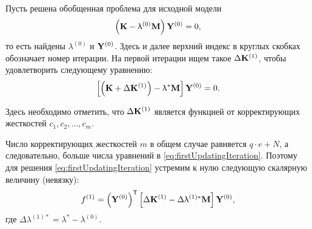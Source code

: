 Пусть решена обобщенная проблема для исходной модели
\begin{equation}
	\left( \mathbf{K} - \uplambda ^ {(0)} \mathbf{M} \right) \mathbf{Y} ^ {(0)} = 0,
	\label{eq:initEigProblem}
\end{equation}
то есть найдены $ \lambda ^ {(0)} $ и $ \mathbf{Y} ^ {(0)} $. Здесь и далее верхний индекс в круглых скобках обозначает номер итерации. На первой итерации ищем такое $ \Delta \mathbf{K} ^ {(1)} $, чтобы удовлетворить следующему уравнению:
\begin{equation}
	\left[ \left( \mathbf{K} + \Delta \mathbf{K} ^ {(1)} \right) - \uplambda ^ \ast \mathbf{M} \right] \mathbf{Y} ^ {(0)} = 0.
	\label{eq:firstUpdatingIteration}
\end{equation}

Здесь необходимо отметить, что $ \Delta \mathbf{K} ^ {(1)} $ является функцией от корректирующих жесткостей $ c_1, c_2, \hdots, c_m $. 

Число корректирующих жесткостей $ m $ в общем случае равняется $ q \cdot e + N $, а следовательно, больше числа уравнений в \eqref{eq:firstUpdatingIteration}. Поэтому для решения \eqref{eq:firstUpdatingIteration} устремим к нулю следующую скалярную величину (невязку):
\begin{equation}
	f ^ {(1)} = \left( \mathbf{Y} ^ {(0)} \right) ^ \mathsf{T} \left[ \Delta \mathbf{K} ^ {(1)} - \Delta \uplambda ^ {(1) \ast} \mathbf{M} \right] \mathbf{Y} ^ {(0)},
	\label{eq:firstResidualUpdating}
\end{equation}
где $ \Delta \lambda ^ {(1) \ast} = \lambda ^ \ast - \lambda ^ {(0)} $.

